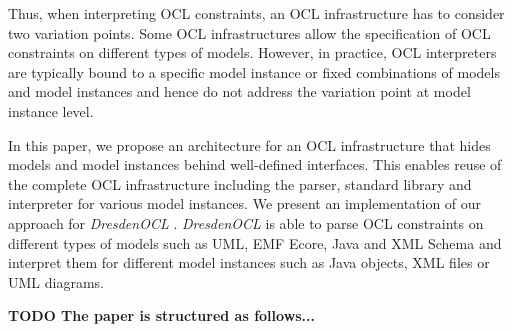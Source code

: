 	Thus, when interpreting OCL constraints, an OCL infrastructure has to consider two 
	variation points. Some OCL infrastructures allow the specification of OCL constraints 
	on different types of models. However, in practice, OCL interpreters are typically bound 
	to a specific model instance or fixed combinations of models and model instances 
	 and hence do not address the variation point at model instance level.
	

	In this paper, we propose an architecture for an OCL
	infrastructure that hides models and model instances behind well-defined interfaces.
	This enables reuse of the complete OCL infrastructure including the parser, 
	standard library and interpreter for various model instances. We present an
	implementation of our approach for \textit{DresdenOCL}
	\cite{WWW:dresdenOCL}. \textit{DresdenOCL} is able to parse OCL
	constraints on different types of models such as UML, EMF Ecore, Java and 
	XML Schema and interpret them for different model instances such as Java 
	objects, XML files or {UML diagrams}.
	
	\textbf{TODO The paper is structured as follows...}